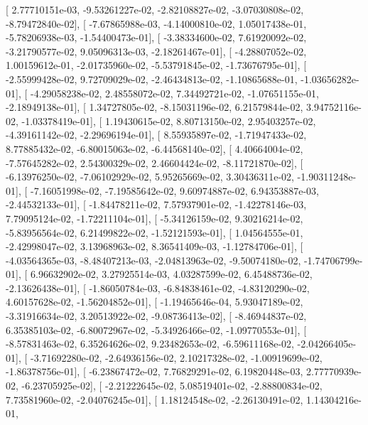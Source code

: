 \documentclass{article}
\begin{document}
       [  2.77710151e-03,  -9.53261227e-02,  -2.82108827e-02,
         -3.07030808e-02,  -8.79472840e-02],
       [ -7.67865988e-03,  -4.14000810e-02,   1.05017438e-01,
         -5.78206938e-03,  -1.54400473e-01],
       [ -3.38334600e-02,   7.61920092e-02,  -3.21790577e-02,
          9.05096313e-03,  -2.18261467e-01],
       [ -4.28807052e-02,   1.00159612e-01,  -2.01735960e-02,
         -5.53791845e-02,  -1.73676795e-01],
       [ -2.55999428e-02,   9.72709029e-02,  -2.46434813e-02,
         -1.10865688e-01,  -1.03656282e-01],
       [ -4.29058238e-02,   2.48558072e-02,   7.34492721e-02,
         -1.07651155e-01,  -2.18949138e-01],
       [  1.34727805e-02,  -8.15031196e-02,   6.21579844e-02,
          3.94752116e-02,  -1.03378419e-01],
       [  1.19430615e-02,   8.80713150e-02,   2.95403257e-02,
         -4.39161142e-02,  -2.29696194e-01],
       [  8.55935897e-02,  -1.71947433e-02,   8.77885432e-02,
         -6.80015063e-02,  -6.44568140e-02],
       [  4.40664004e-02,  -7.57645282e-02,   2.54300329e-02,
          2.46604424e-02,  -8.11721870e-02],
       [ -6.13976250e-02,  -7.06102929e-02,   5.95265669e-02,
          3.30436311e-02,  -1.90311248e-01],
       [ -7.16051998e-02,  -7.19585642e-02,   9.60974887e-02,
          6.94353887e-03,  -2.44532133e-01],
       [ -1.84478211e-02,   7.57937901e-02,  -1.42278146e-03,
          7.79095124e-02,  -1.72211104e-01],
       [ -5.34126159e-02,   9.30216214e-02,  -5.83956564e-02,
          6.21499822e-02,  -1.52121593e-01],
       [  1.04564555e-01,  -2.42998047e-02,   3.13968963e-02,
          8.36541409e-03,  -1.12784706e-01],
       [ -4.03564365e-03,  -8.48407213e-03,  -2.04813963e-02,
         -9.50074180e-02,  -1.74706799e-01],
       [  6.96632902e-02,   3.27925514e-03,   4.03287599e-02,
          6.45488736e-02,  -2.13626438e-01],
       [ -1.86050784e-03,  -6.84838461e-02,  -4.83120290e-02,
          4.60157628e-02,  -1.56204852e-01],
       [ -1.19465646e-04,   5.93047189e-02,  -3.31916634e-02,
          3.20513922e-02,  -9.08736413e-02],
       [ -8.46944837e-02,   6.35385103e-02,  -6.80072967e-02,
         -5.34926466e-02,  -1.09770553e-01],
       [ -8.57831463e-02,   6.35264626e-02,   9.23482653e-02,
         -6.59611168e-02,  -2.04266405e-01],
       [ -3.71692280e-02,  -2.64936156e-02,   2.10217328e-02,
         -1.00919699e-02,  -1.86378756e-01],
       [ -6.23867472e-02,   7.76829291e-02,   6.19820448e-03,
          2.77770939e-02,  -6.23705925e-02],
       [ -2.21222645e-02,   5.08519401e-02,  -2.88800834e-02,
          7.73581960e-02,  -2.04076245e-01],
       [  1.18124548e-02,  -2.26130491e-02,   1.14304216e-01,
\end{document}
